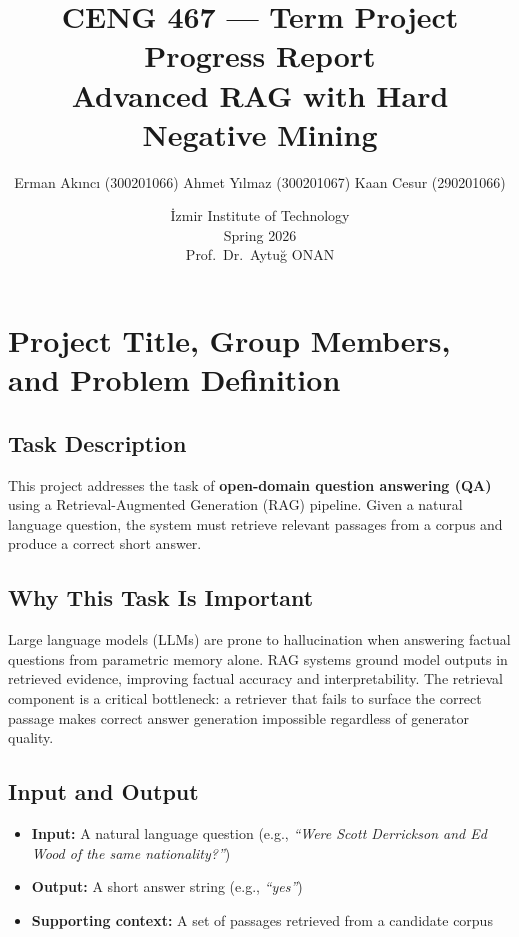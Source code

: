 \documentclass[12pt,a4paper]{article}
\title{
    \textbf{CENG 467 — Term Project Progress Report} \\[0.5em]
    \Large Advanced RAG with Hard Negative Mining
}
\author{
    Erman Akıncı (300201066) \quad
    Ahmet Yılmaz (300201067) \quad
    Kaan Cesur (290201066)
}
\date{
    İzmir Institute of Technology \\
    Spring 2026 \\[0.3em]
    Prof.\ Dr.\ Aytuğ ONAN
}
\begin{document}
\maketitle
\tableofcontents
\newpage

\section{Project Title, Group Members, and Problem Definition}

\subsection*{Task Description}

This project addresses the task of \textbf{open-domain question answering (QA)} using a
Retrieval-Augmented Generation (RAG) pipeline. Given a natural language question, the
system must retrieve relevant passages from a corpus and produce a correct short answer.

\subsection*{Why This Task Is Important}

Large language models (LLMs) are prone to hallucination when answering factual questions
from parametric memory alone. RAG systems ground model outputs in retrieved evidence,
improving factual accuracy and interpretability. The retrieval component is a critical
bottleneck: a retriever that fails to surface the correct passage makes correct answer
generation impossible regardless of generator quality.

\subsection*{Input and Output}

\begin{itemize}[noitemsep]
    \item \textbf{Input:} A natural language question
          (e.g., \textit{``Were Scott Derrickson and Ed Wood of the same nationality?''})
    \item \textbf{Output:} A short answer string (e.g., \textit{``yes''})
    \item \textbf{Supporting context:} A set of passages retrieved from a candidate corpus
\end{itemize}
\end{document}
